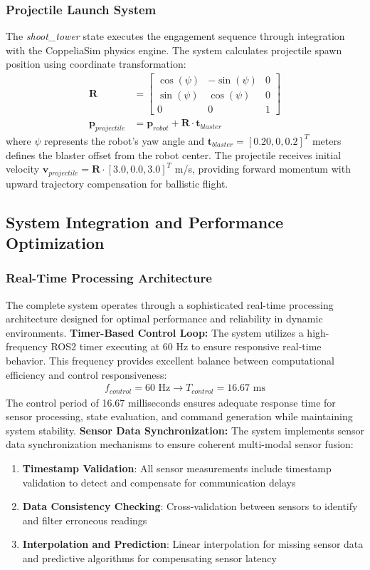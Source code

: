 \subsubsection{Projectile Launch System}
The \textit{shoot\_tower} state executes the engagement sequence through integration with the CoppeliaSim physics engine. The system calculates projectile spawn position using coordinate transformation:
\begin{align} \mathbf{R} &= \begin{bmatrix} \cos(\psi) & -\sin(\psi) & 0 \\ \sin(\psi) & \cos(\psi) & 0 \\ 0 & 0 & 1 \end{bmatrix} \\ \mathbf{p}_{projectile} &= \mathbf{p}_{robot} + \mathbf{R} \cdot \mathbf{t}_{blaster} \end{align}
where $\psi$ represents the robot's yaw angle and $\mathbf{t}_{blaster} = [0.20, 0, 0.2]^T$ meters defines the blaster offset from the robot center.
The projectile receives initial velocity $\mathbf{v}_{projectile} = \mathbf{R} \cdot [3.0, 0.0, 3.0]^T$ m/s, providing forward momentum with upward trajectory compensation for ballistic flight.
\subsection{System Integration and Performance Optimization}
\subsubsection{Real-Time Processing Architecture}
The complete system operates through a sophisticated real-time processing architecture designed for optimal performance and reliability in dynamic environments.
\textbf{Timer-Based Control Loop:}
The system utilizes a high-frequency ROS2 timer executing at 60 Hz to ensure responsive real-time behavior. This frequency provides excellent balance between computational efficiency and control responsiveness:
\begin{align}
f_{control} = 60 \text{ Hz} \rightarrow T_{control} = 16.67 \text{ ms}
\end{align}
The control period of 16.67 milliseconds ensures adequate response time for sensor processing, state evaluation, and command generation while maintaining system stability.
\textbf{Sensor Data Synchronization:}
The system implements sensor data synchronization mechanisms to ensure coherent multi-modal sensor fusion:
\begin{enumerate}
\item \textbf{Timestamp Validation}: All sensor measurements include timestamp validation to detect and compensate for communication delays
\item \textbf{Data Consistency Checking}: Cross-validation between sensors to identify and filter erroneous readings
\item \textbf{Interpolation and Prediction}: Linear interpolation for missing sensor data and predictive algorithms for compensating sensor latency
\end{enumerate}
